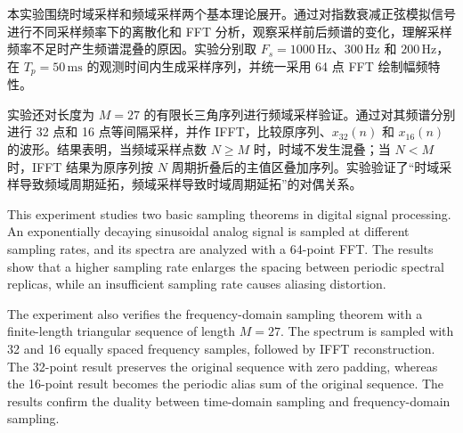 \documentclass[bachelor,ktreport,openany,oneside,AutoFakeBold=true]{buaathesis}
\newcommand{\Hz}{\mathrm{Hz}}
\begin{document}


\pagestyle{mainmatter}
\maketitle

\pagestyle{frontmatter}
\begin{cabstract}
本实验围绕时域采样和频域采样两个基本理论展开。通过对指数衰减正弦模拟信号进行不同采样频率下的离散化和 FFT 分析，观察采样前后频谱的变化，理解采样频率不足时产生频谱混叠的原因。实验分别取 \(F_s=1000\,\Hz\)、\(300\,\Hz\) 和 \(200\,\Hz\)，在 \(T_p=50\,\mathrm{ms}\) 的观测时间内生成采样序列，并统一采用 64 点 FFT 绘制幅频特性。

实验还对长度为 \(M=27\) 的有限长三角序列进行频域采样验证。通过对其频谱分别进行 32 点和 16 点等间隔采样，并作 IFFT，比较原序列、\(x_{32}(n)\) 和 \(x_{16}(n)\) 的波形。结果表明，当频域采样点数 \(N\ge M\) 时，时域不发生混叠；当 \(N<M\) 时，IFFT 结果为原序列按 \(N\) 周期折叠后的主值区叠加序列。实验验证了“时域采样导致频域周期延拓，频域采样导致时域周期延拓”的对偶关系。
\end{cabstract}

\begin{eabstract}
This experiment studies two basic sampling theorems in digital signal processing. An exponentially decaying sinusoidal analog signal is sampled at different sampling rates, and its spectra are analyzed with a 64-point FFT. The results show that a higher sampling rate enlarges the spacing between periodic spectral replicas, while an insufficient sampling rate causes aliasing distortion.

The experiment also verifies the frequency-domain sampling theorem with a finite-length triangular sequence of length \(M=27\). The spectrum is sampled with 32 and 16 equally spaced frequency samples, followed by IFFT reconstruction. The 32-point result preserves the original sequence with zero padding, whereas the 16-point result becomes the periodic alias sum of the original sequence. The results confirm the duality between time-domain sampling and frequency-domain sampling.
\end{eabstract}
\end{document}

